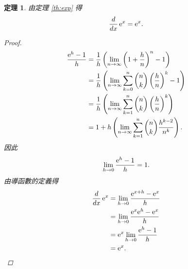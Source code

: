 \documentclass[a4paper]{article}
\newcommand  {\e}{\textup e}
\theoremstyle{plain}
\newtheorem{theorem}{定理}
\theoremstyle{definition}
\theoremstyle{remark}
\begin{document}
\begin{CJK}{UTF8}{bsmi}
\begin{theorem}
  由定理 \ref{th:exp} 得
  \[\frac{d}{dx}\,\e^x = \e^x.\]
  \begin{proof}
    \begin{align*}
      \frac{\e^h - 1}{h} &= \frac1h \left( \lim_{n \to \infty} \left( 1 + \frac h n \right)^n - 1 \right)\\
	&= \frac1h \left( \lim_{n \to \infty} \sum_{k=0}^n \binom n k \left( \frac h n \right)^k - 1 \right)\\
	&= \frac1h \left( \lim_{n \to \infty} \sum_{k=1}^n \binom n k \left( \frac h n \right)^k \right)\\
	&= 1 + h \left( \lim_{n \to \infty} \sum_{k=1}^n \binom n k \frac{h^{k-2}}{n^k} \right).
    \end{align*}
    因此
    \[\lim_{h \to 0} \frac{\e^h - 1}{h} = 1.\]
    由導函數的定義得
    \begin{align*}
      \frac{d}{dx}\,\e^x &= \lim_{h \to 0} \frac{\e^{x+h} - \e^x}{h}\\
	&= \lim_{h \to 0} \frac{\e^x \e^h - \e^x}{h}\\
	&= \e^x \lim_{h \to 0} \frac{\e^h - 1}{h}\\
	&= \e^x. \qedhere
    \end{align*}
  \end{proof}
\end{theorem}

\clearpage
\end{CJK}
\end{document}

